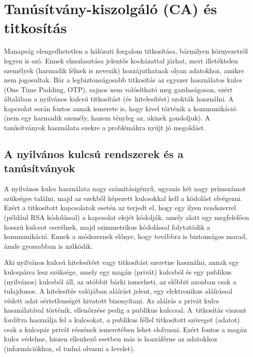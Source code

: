 \chapter{Tanúsítvány-kiszolgáló (CA) és titkosítás}

Manapság elengedhetetlen a hálózati forgalom titkosítása, bármilyen környezetről legyen is szó. Ennek elmulasztása
jelentős kockázattal járhat, mert illetéktelen személyek (harmadik félnek is nevezik) hozzájuthatnak olyan adatokhoz,
amikre nem jogosultak. Bár a legbiztonságosabb titkosítás az egyszer használatos kulcs (One Time Padding, OTP), sajnos
nem valósítható meg gazdaságosan, ezért általában a nyilvános kulcsú titkosítást (és~hitelesítést) szokták
használni. A kapcsolat során fontos annak ismerete is, hogy kivel történik a kommunikáció (nem egy harmadik személy,
hanem tényleg az, akinek gondoljuk). A tanúsítványok használata ezekre a problémákra nyújt jó megoldást.


\section{A nyilvános kulcsú rendszerek és a tanúsítványok}
A nyilvános kulcs használata nagy számításigényű, ugyanis két nagy prímszámot szükséges találni, majd az ezekből
képezett kulcsokkal kell a kódolást elvégezni. Ezért a titkosított kapcsolatok esetén az terjedt el, hogy egy ilyen
rendszerrel (például RSA kódolással) a kapcsolat elejét kódolják, amely alatt egy megfelelően hosszú kulcsot cserélnek,
majd szimmetrikus kódolással folytatódik a kommunikáció. Ennek a módszernek előnye, hogy továbbra is biztonságos marad,
ámde gyorsabban is működik.

Aki nyilvános kulcsú hitelesítést vagy titkosítást szeretne használni, annak egy kulcspárra lesz szüksége, amely egy
magán (privát) kulcsból és egy publikus (nyilvános) kulcsból áll, az utóbbit bárki ismerheti, az előbbit azonban csak a
tulajdonos. A hitelesítés valójában aláírást jelent, egy elektronikus aláírással védett adat sértetlenségét hivatott
bizonyítani. Az aláírás a privát kulcs használatával történik, ellenőrzése pedig a publikus kulccsal. A~titkosítás
viszont fordítva használja fel a kulcsokat, a publikus féllel titkosított szöveget (adatot) csak a kulcspár privát
részének ismeretében lehet elolvasni. Ezért fontos a magán kulcs védelme, hiszen ellenkező esetben más is hozzáférne az
adatokhoz (információkhoz, el tudná olvasni a levelet).

